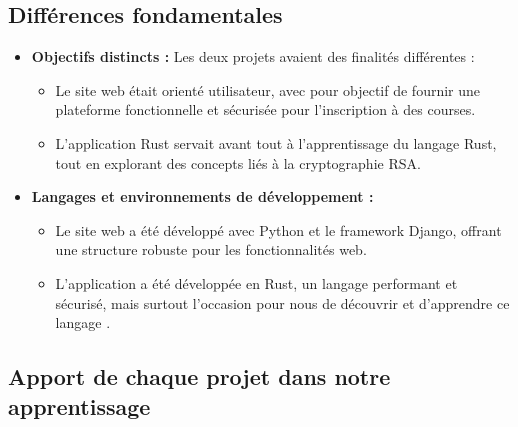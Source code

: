 \documentclass[12pt]{article} %
\begin{document}
\subsection{Différences fondamentales}

\begin{itemize}
    \item \textbf{Objectifs distincts :}  
    Les deux projets avaient des finalités différentes :
    \begin{itemize}
        \item Le site web était orienté utilisateur, avec pour objectif de fournir une plateforme fonctionnelle et sécurisée pour l'inscription à des courses.
        \item L'application Rust servait avant tout à l'apprentissage du langage Rust, tout en explorant des concepts liés à la cryptographie RSA.
    \end{itemize}
    
    \item \textbf{Langages et environnements de développement :}  
    \begin{itemize}
        \item Le site web a été développé avec Python et le framework Django, offrant une structure robuste pour les fonctionnalités web.
        \item L'application a été développée en Rust, un langage performant et sécurisé, mais surtout l'occasion pour nous de découvrir et d'apprendre ce langage .
    \end{itemize}
\end{itemize}

\subsection{Apport de chaque projet dans notre apprentissage}
\end{document}
